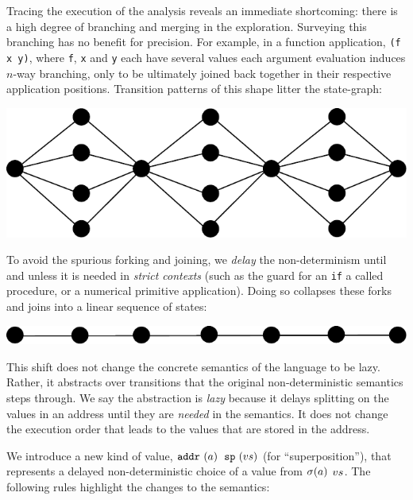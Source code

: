 \documentclass[preprint,onecolumn,9pt]{sigplanconf} %
\begin{document}
Tracing the execution of the analysis reveals an immediate shortcoming:
there is a high degree of branching and merging in the exploration.
%
Surveying this branching has no benefit for precision.
%
For example, in a function application, {\tt (f x y)},
where {\tt f}, {\tt x} and {\tt y} each have several values
each argument evaluation induces $n$-way branching, only to be ultimately joined back together in their respective
application positions. 
%
Transition patterns of this shape litter the state-graph:
%
\begin{center}
\includegraphics[scale=0.3]{fanout}
\end{center}
To avoid the spurious forking and joining, we {\it delay} the non-determinism
until and unless it is needed in {\it strict contexts} (such as the guard for an
{\tt if} a called procedure, or a numerical primitive application). 
%
Doing so collapses these forks and joins into a linear sequence of states:
\begin{center}
\includegraphics[scale=0.3]{lazy}
\end{center}

This shift does not change the concrete semantics of the language to
be lazy.  Rather, it abstracts over transitions that the original
non-deterministic semantics steps through.
%
We say the abstraction is \emph{lazy} because it delays splitting on
the values in an address until they are \emph{needed} in the
semantics. It does not change the execution order that leads to the
values that are stored in the address.

We introduce a new kind of value,
\spchoice
{${\tt addr{\ }}({a})$}
{${\tt sp{\ }}({v{s}})$ (for ``superposition'')},
%
that represents a delayed non-deterministic choice of a value from
\spchoice
{$\sigma(a)$}
{$v{s}$}.
%
The following rules highlight the changes to the semantics:

\renewcommand{\ext}{\mathit{ext}}
\end{document}
